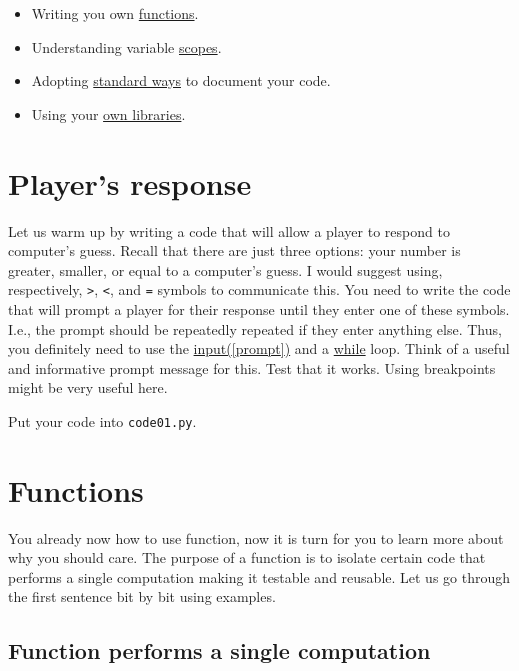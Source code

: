 \documentclass[
]{book}
\providecommand{\tightlist}{%
  \setlength{\itemsep}{0pt}\setlength{\parskip}{0pt}}
\begin{document}
\begin{itemize}
\tightlist
\item
  Writing you own \protect\hyperlink{function}{functions}.
\item
  Understanding variable \protect\hyperlink{scopes-for-immutable-values}{scopes}.
\item
  Adopting \protect\hyperlink{numpy-docstring}{standard ways} to document your code.
\item
  Using your \protect\hyperlink{using-you-own-libraries}{own libraries}.
\end{itemize}

\hypertarget{guess-the-number-players-response}{%
\section{Player's response}\label{guess-the-number-players-response}}

Let us warm up by writing a code that will allow a player to respond to computer's guess. Recall that there are just three options: your number is greater, smaller, or equal to a computer's guess. I would suggest using, respectively, \texttt{\textgreater{}}, \texttt{\textless{}}, and \texttt{=} symbols to communicate this. You need to write the code that will prompt a player for their response until they enter one of these symbols. I.e., the prompt should be repeatedly repeated if they enter anything else. Thus, you definitely need to use the \href{https://docs.python.org/3/library/functions.html\#input}{input({[}prompt{]})} and a \protect\hyperlink{while-loop}{while} loop. Think of a useful and informative prompt message for this. Test that it works. Using breakpoints might be very useful here.

Put your code into \texttt{code01.py}.

\hypertarget{function}{%
\section{Functions}\label{function}}

You already now how to use function, now it is turn for you to learn more about why you should care. The purpose of a function is to isolate certain code that performs a single computation making it testable and reusable. Let us go through the first sentence bit by bit using examples.

\hypertarget{function-performs-a-single-computation}{%
\subsection{Function performs a single computation}\label{function-performs-a-single-computation}}
\end{document}
